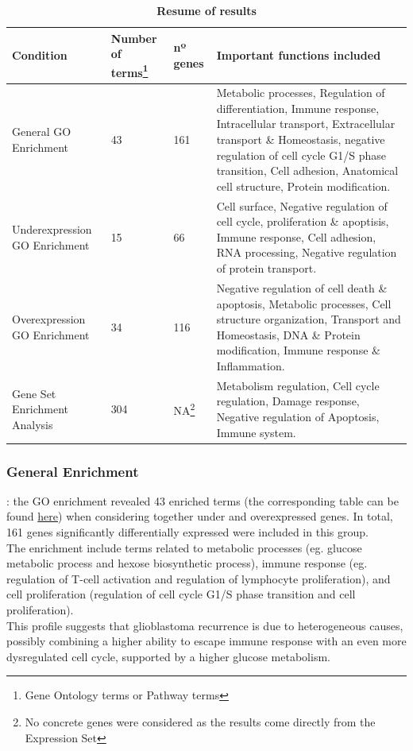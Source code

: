 \documentclass[9pt,twocolumn,twoside]{gsajnl}
\begin{document}
\begin{table}[!htbp]
\centering
\caption{\bf Resume of results}
\begin{tableminipage}{\textwidth}
\begin{tabularx}{\textwidth}{m{3.4cm}m{2.6cm}m{1.5cm}m{9.2cm}}
\hline
Condition & Number of terms\footnote{Gene Ontology terms or Pathway terms} & nº genes & Important functions included\\
\hline

General GO Enrichment & 43 & 161 & Metabolic processes, Regulation of differentiation, Immune response, Intracellular transport, Extracellular transport \& Homeostasis, negative regulation of cell cycle G1/S phase transition, Cell adhesion, Anatomical cell structure, Protein modification. \\

Underexpression GO Enrichment & 15 & 66 & Cell surface, Negative regulation of cell cycle, proliferation \& apoptisis, Immune response, Cell adhesion, RNA processing, Negative regulation of protein transport.\\

Overexpression GO Enrichment & 34 & 116 & Negative regulation of cell death \& apoptosis, Metabolic processes, Cell structure organization, Transport and Homeostasis, DNA \& Protein modification, Immune response \& Inflammation.\\

Gene Set Enrichment Analysis & 304 & NA\footnote{No concrete genes were considered as the results come directly from the Expression Set} & Metabolism regulation, Cell cycle regulation, Damage response, Negative regulation of Apoptosis, Immune system. \\

\hline
\end{tabularx}
  \label{tab:resume}
\end{tableminipage}
\end{table}

\subsubsection*{General Enrichment}: the GO enrichment revealed 43 enriched terms (the corresponding table can be found \href{http://ieoproject.tk/supplementary/goresults.html}{here}) when considering together under and overexpressed genes. In total, 161 genes significantly differentially expressed were included in this group.\\
The enrichment include terms related to metabolic processes (eg. glucose metabolic process and hexose biosynthetic process), immune response (eg. regulation of T-cell activation and regulation of lymphocyte proliferation), and cell proliferation (regulation of cell cycle G1/S phase transition and cell proliferation).\\
This profile suggests that glioblastoma recurrence is due to heterogeneous causes, possibly combining a higher ability to escape immune response with an even more dysregulated cell cycle, supported by a higher glucose metabolism.
\end{document}
